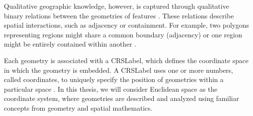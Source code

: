 Qualitative geographic knowledge, however, is captured through qualitative binary relations between the geometries of features \cite{renzQualitativeSpatialReasoning2007}. These relations describe spatial interactions, such as adjacency or containment. For example, two polygons representing regions might share a common boundary (adjacency) or one region might be entirely contained within another .

Each geometry is associated with a \acrfull{CRSLabel}, which defines the coordinate space in which the geometry is embedded. A \acrshort{CRSLabel} uses one or more numbers, called coordinates, to uniquely specify the position of geometries within a particular space \cite{malingCoordinateSystemsMap1992}. In this thesis, we will consider Euclidean space as the coordinate system, where geometries are described and analyzed using familiar concepts from geometry and spatial mathematics.

